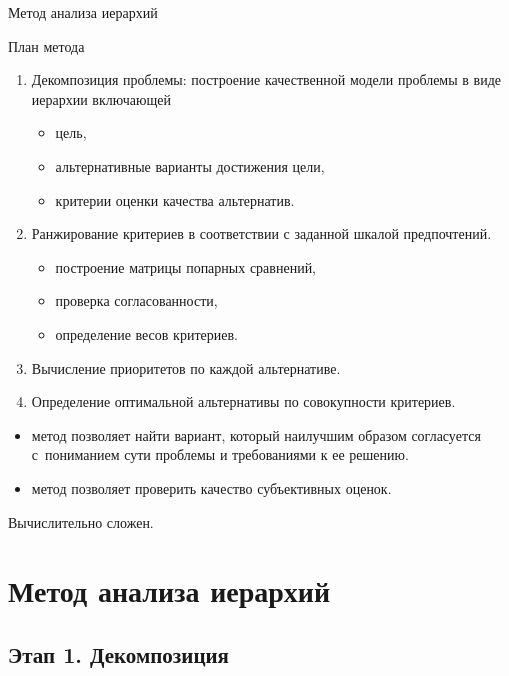 \documentclass[unicode,11pt,notheorems,xcolor=table]{beamer}
\begin{document}
\begin{frame}[allowframebreaks]{Метод анализа иерархий}

    \begin{alertblock}{План метода}
    \begin{enumerate}
        \item Декомпозиция проблемы: построение качественной модели проблемы в виде иерархии  включающей 
        \begin{itemize}
            \item цель,
            \item альтернативные варианты достижения цели,
            \item критерии оценки качества альтернатив.
        \end{itemize}
        \item Ранжирование критериев в соответствии с заданной шкалой предпочтений. 
        \begin{itemize}
            \item построение матрицы попарных сравнений,
            \item проверка согласованности,
            \item определение весов критериев.
        \end{itemize}
        \item Вычисление приоритетов по каждой альтернативе.            
        \item Определение оптимальной альтернативы по совокупности критериев.
    \end{enumerate}    
    \end{alertblock}
    \framebreak
    \begin{itemize}
        \item метод позволяет найти  вариант, который наилучшим образом согласуется с~пониманием сути проблемы и требованиями к ее решению.
        \item метод позволяет проверить качество субъективных оценок.
    \end{itemize}

    \bigskip
        Вычислительно сложен.
    
\end{frame}

\section{Метод анализа иерархий}
\subsection{Этап 1. Декомпозиция}
\end{document}
